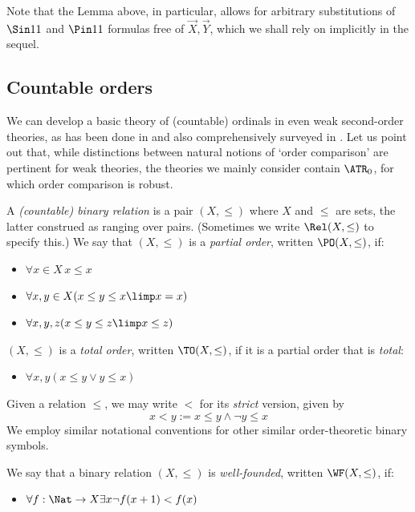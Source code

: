 Note that the Lemma above, in particular, allows for arbitrary substitutions of $\Sin 1 1 $ and $\Pin 1 1 $ formulas free of $\vec X,\vec Y$, which we shall rely on implicitly in the sequel.






\subsection{Countable orders}
We can develop a basic theory of (countable) ordinals in even weak second-order theories, as has been done in \cite{Simpson99:monograph} and also comprehensively surveyed in \cite{hirst05:ord-arith-rm-survey}.
Let us point out that, while distinctions between natural notions of `order comparison' are pertinent for weak theories, the theories we mainly consider contain $\ATR_0$, for which order comparison is robust.

A \emph{(countable) binary relation} is a pair $ (X,\leq)$ where $X$ and $\leq$ are sets, the latter construed as ranging over pairs. 
(Sometimes we write $\Rel(X,\leq)$ to specify this.)
We say that $(X,\leq)$ is a \emph{partial order}, written $\PO(X,\leq)$, if:
\begin{itemize}
    \item $\forall x \in X \, x\leq x$
    \item $\forall x,y \in X (x\leq y \leq x \limp x=x)$
    \item $\forall x,y,z (x\leq y\leq z \limp x\leq z)$
\end{itemize}

$(X,\leq)$ is a \emph{total order}, written $\TO(X,\leq)$, if it is a partial order that is \emph{total}:
\begin{itemize}
    \item $\forall x,y (x\leq y \lor y\leq x)$
\end{itemize}

Given a relation $\leq$, we may write $<$ for its \emph{strict} version, given by
\[
x<y := x\leq y \land \lnot y\leq x
\]
We employ similar notational conventions for other similar order-theoretic binary symbols.

We say that a binary relation $(X,\leq)$ is \emph{well-founded}, written $\WF(X,\leq)$, if:
\begin{itemize}
    \item $\forall f: \Nat \to X \exists x \lnot f(x+1)<f(x)$
\end{itemize}

